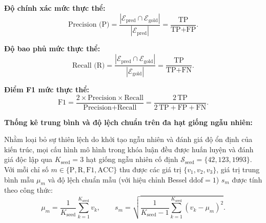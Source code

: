 \textbf{Độ chính xác mức thực thể:}
\begin{equation}
    \label{eq:metric_precision}
    \text{Precision (P)} = \frac{\left|\mathcal{E}_{\text{pred}} \cap \mathcal{E}_{\text{gold}}\right|}{\left|\mathcal{E}_{\text{pred}}\right|} = \frac{\text{TP}}{\text{TP} + \text{FP}}.
\end{equation}

\textbf{Độ bao phủ mức thực thể:}
\begin{equation}
    \label{eq:metric_recall}
    \text{Recall (R)} = \frac{\left|\mathcal{E}_{\text{pred}} \cap \mathcal{E}_{\text{gold}}\right|}{\left|\mathcal{E}_{\text{gold}}\right|} = \frac{\text{TP}}{\text{TP} + \text{FN}}.
\end{equation}

\textbf{Điểm F1 mức thực thể:}
\begin{equation}
    \label{eq:metric_f1}
    \text{F1} = \frac{2 \times \text{Precision} \times \text{Recall}}{\text{Precision} + \text{Recall}} = \frac{2\,\text{TP}}{2\,\text{TP} + \text{FP} + \text{FN}}.
\end{equation}

\textbf{Thống kê trung bình và độ lệch chuẩn trên đa hạt giống ngẫu nhiên:}

Nhằm loại bỏ sự thiên lệch do khởi tạo ngẫu nhiên và đánh giá độ ổn định của kiến trúc, mọi cấu hình mô hình trong khóa luận đều được huấn luyện và đánh giá độc lập qua $K_{\text{seed}} = 3$ hạt giống ngẫu nhiên cố định $\mathcal{S}_{\text{seed}} = \{42, 123, 1993\}$. Với mỗi chỉ số $m \in \{\text{P}, \text{R}, \text{F1}, \text{ACC}\}$ thu được các giá trị $\{v_1, v_2, v_3\}$, giá trị trung bình mẫu $\mu_m$ và độ lệch chuẩn mẫu (với hiệu chỉnh Bessel $\text{ddof}=1$) $s_m$ được tính theo công thức:
\begin{equation}
    \label{eq:mean_std}
    \mu_m = \frac{1}{K_{\text{seed}}} \sum_{k=1}^{K_{\text{seed}}} v_k, \qquad s_m = \sqrt{\frac{1}{K_{\text{seed}} - 1} \sum_{k=1}^{K_{\text{seed}}} \left(v_k - \mu_m\right)^2}.
\end{equation}

